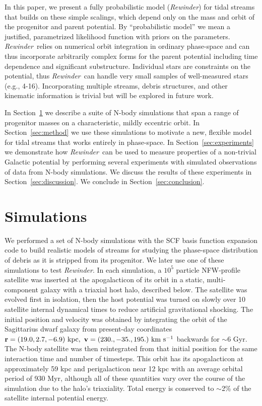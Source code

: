 \documentclass[letterpaper,12pt,preprint]{aastex}
\newcommand{\rewinder}{\emph{Rewinder}}
\begin{document}
In this paper, we present a fully probabilistic model (\rewinder) for tidal streams that builds on these simple scalings, which depend only on the mass and orbit of the progenitor and parent potential. By ``probabilistic model'' we mean a justified, parametrized likelihood function with priors on the parameters. \rewinder\ relies on numerical orbit integration in ordinary phase-space and can thus incorporate arbitrarily complex forms for the parent potential including time dependence and significant substructure. Individual stars are constraints on the potential, thus \rewinder\ can handle very small samples of well-measured stars (e.g., 4-16). Incorporating multiple streams, debris structures, and other kinematic information is trivial but will be explored in future work.

In Section~\ref{sec:sims} we describe a suite of N-body simulations that span a range of progenitor masses on a characteristic, mildly eccentric orbit. In Section~\ref{sec:method} we use these simulations to motivate a new, flexible model for tidal streams that works entirely in phase-space. In Section~\ref{sec:experiments} we demonstrate how \rewinder\ can be used to measure properties of a non-trivial Galactic potential by performing several experiments with simulated observations of data from N-body simulations. We discuss the results of these experiments in Section~\ref{sec:discussion}. We conclude in Section~\ref{sec:conclusion}.

\section{Simulations}\label{sec:sims}
We performed a set of N-body simulations with the SCF basis function expansion code \citep{hernquist92} to build realistic models of streams for studying the phase-space distribution of debris as it is stripped from its progenitor. We later use one of these simulations to test \rewinder. In each simulation, a $10^5$ particle NFW-profile satellite was inserted at the apogalacticon of its orbit in a static, multi-component galaxy with a triaxial host halo, described below. The satellite was evolved first in isolation, then the host potential was turned on slowly over 10 satellite internal dynamical times to reduce artificial gravitational shocking. The initial position and velocity was obtained by integrating the orbit of the Sagittarius dwarf galaxy from present-day coordinates ${\bf r}  =(19.0, 2.7, -6.9)\ \mathrm{kpc}, \ {\bf v} = (230., -35., 195.) \ \mathrm{km\ s^{-1}}$ \citep{law10} backwards for $\sim$6 Gyr. The N-body satellite was then reintegrated from that initial position for the same interaction time and number of timesteps. This orbit has its apogalacticon at approximately 59 kpc and perigalacticon near 12 kpc with an average orbital period of 930 Myr, although all of these quantities vary over the course of the simulation due to the halo's triaxiality. Total energy is conserved to $\sim$2\% of the satellite internal potential energy.
\end{document}
